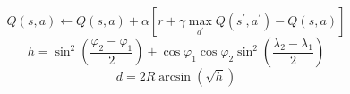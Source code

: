 \documentclass[12pt,a4paper]{article}
\begin{document}
\begin{equation}
Q(s,a)\leftarrow Q(s,a)+\alpha\left[r+\gamma\max_{a^{\prime}}Q(s^{\prime},a^{\prime})-Q(s,a)\right]\tag{2.1}
\end{equation}
\begin{equation}
h=\sin^2\left(\frac{\varphi_2-\varphi_1}{2}\right)+\cos\varphi_1\cos\varphi_2\sin^2\left(\frac{\lambda_2-\lambda_1}{2}\right)\tag{2.2}
\end{equation}
\begin{equation}
d=2R\arcsin\left(\sqrt{h}\right)\tag{2.3}
\end{equation}
\end{document}
